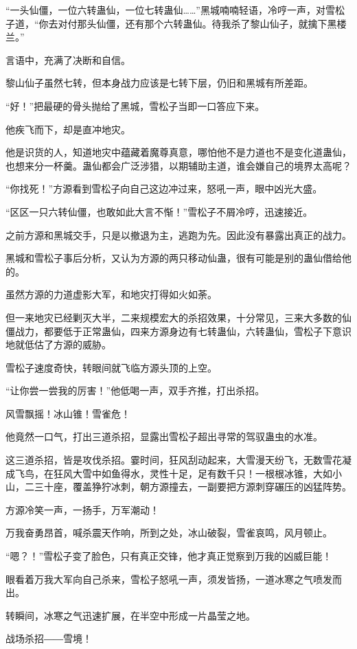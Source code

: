 \begin{this_body}
“一头仙僵，一位六转蛊仙，一位七转蛊仙……”黑城喃喃轻语，冷哼一声，对雪松子道，“你去对付那头仙僵，还有那个六转蛊仙。待我杀了黎山仙子，就擒下黑楼兰。”

言语中，充满了决断和自信。

黎山仙子虽然七转，但本身战力应该是七转下层，仍旧和黑城有所差距。

“好！”把最硬的骨头抛给了黑城，雪松子当即一口答应下来。

他疾飞而下，却是直冲地灾。

他是识货的人，知道地灾中蕴藏着魔尊真意，哪怕他不是力道也不是变化道蛊仙，也想来分一杯羹。蛊仙都会广泛涉猎，以期辅助主道，谁会嫌自己的境界太高呢？

“你找死！”方源看到雪松子向自己这边冲过来，怒吼一声，眼中凶光大盛。

“区区一只六转仙僵，也敢如此大言不惭！”雪松子不屑冷哼，迅速接近。

之前方源和黑城交手，只是以撤退为主，逃跑为先。因此没有暴露出真正的战力。

黑城和雪松子事后分析，又认为方源的两只移动仙蛊，很有可能是别的蛊仙借给他的。

虽然方源的力道虚影大军，和地灾打得如火如荼。

但一来地灾已经剿灭大半，二来规模宏大的杀招效果，十分常见，三来大多数的仙僵战力，都要低于正常蛊仙，四来方源身边有七转蛊仙，六转蛊仙，雪松子下意识地就低估了方源的威胁。

雪松子速度奇快，转眼间就飞临方源头顶的上空。

“让你尝一尝我的厉害！”他低喝一声，双手齐推，打出杀招。

风雪飘摇！冰山锥！雪雀危！

他竟然一口气，打出三道杀招，显露出雪松子超出寻常的驾驭蛊虫的水准。

这三道杀招，皆是攻伐杀招。霎时间，狂风刮动起来，大雪漫天纷飞，无数雪花凝成飞鸟，在狂风大雪中如鱼得水，灵性十足，足有数千只！一根根冰锥，大如小山，二三十座，覆盖狰狞冰刺，朝方源撞去，一副要把方源刺穿碾压的凶猛阵势。

方源冷笑一声，一扬手，万军潮动！

万我奋勇昂首，喊杀震天作响，所到之处，冰山破裂，雪雀哀鸣，风月顿止。

“嗯？！”雪松子变了脸色，只有真正交锋，他才真正觉察到万我的凶威巨能！

眼看着万我大军向自己杀来，雪松子怒吼一声，须发皆扬，一道冰寒之气喷发而出。

转瞬间，冰寒之气迅速扩展，在半空中形成一片晶莹之地。

战场杀招――雪境！


\end{this_body}
